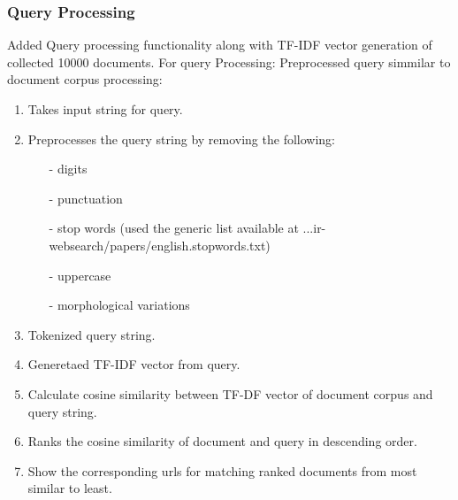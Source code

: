 \documentclass[12pt]{article}
\begin{document}
\subsubsection*{Query Processing}
Added Query processing functionality along with TF-IDF vector generation of collected 10000 documents.
For query Processing:
Preprocessed query simmilar to document corpus processing:
\begin{enumerate}
\item Takes input string for query. 
\item Preprocesses the query string by removing the following: 
	\begin{itemize}
		\item[-] digits
		\item[-] punctuation
		\item[-] stop words (used the generic list available at ...ir-	websearch/papers/english.stopwords.txt)
		\item[-] uppercase
		\item[-] morphological variations
	\end{itemize}
\item Tokenized query string.
\item Generetaed TF-IDF vector from query.
\item Calculate cosine similarity between TF-DF vector of document corpus and query string. 
\item Ranks the cosine similarity of document and query in descending order. 
\item Show the corresponding urls for matching ranked documents from most similar to least.
\end{enumerate}
\end{document}
